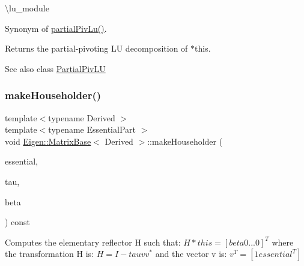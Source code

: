 \textbackslash{}lu\+\_\+module

Synonym of \mbox{\hyperlink{class_eigen_1_1_matrix_base_a6199d8aaf26c1b8ac3097fdfa7733a1e}{partial\+Piv\+Lu()}}.

\begin{DoxyReturn}{Returns}
the partial-\/pivoting LU decomposition of {\ttfamily $\ast$this}.
\end{DoxyReturn}
\begin{DoxySeeAlso}{See also}
class \mbox{\hyperlink{class_eigen_1_1_partial_piv_l_u}{Partial\+Piv\+LU}} 
\end{DoxySeeAlso}
\mbox{\label{class_eigen_1_1_matrix_base_a13291e900f7e81ddc6e5b8802f82092b}} 
\subsubsection{\texorpdfstring{makeHouseholder()}{makeHouseholder()}}
{\footnotesize\ttfamily template$<$typename Derived $>$ \\
template$<$typename Essential\+Part $>$ \\
void \mbox{\hyperlink{class_eigen_1_1_matrix_base}{Eigen\+::\+Matrix\+Base}}$<$ Derived $>$\+::make\+Householder (\begin{DoxyParamCaption}\item[{Essential\+Part \&}]{essential,  }\item[{\mbox{\hyperlink{class_eigen_1_1_dense_base_a5feed465b3a8e60c47e73ecce83e39a2}{Scalar}} \&}]{tau,  }\item[{Real\+Scalar \&}]{beta }\end{DoxyParamCaption}) const}

Computes the elementary reflector H such that\+: $ H *this = [ beta 0 ... 0]^T $ where the transformation H is\+: $ H = I - tau v v^*$ and the vector v is\+: $ v^T = [1 essential^T] $

